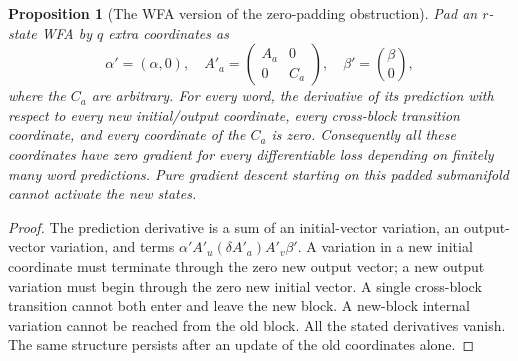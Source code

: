 \documentclass[11pt]{article}
\newtheorem{proposition}[theorem]{Proposition}
\theoremstyle{definition}
\theoremstyle{remark}
\begin{document}
\begin{proposition}[The WFA version of the zero-padding obstruction]
\label{ce:wfa-dead}
Pad an $r$-state WFA by $q$ extra coordinates as
\[
 \alpha'=(\alpha,0),\quad
 A'_a=\begin{pmatrix}A_a&0\\0&C_a\end{pmatrix},\quad
 \beta'=\binom\beta0,
\]
where the $C_a$ are arbitrary. For every word, the derivative of its
prediction with respect to every new initial/output coordinate, every
cross-block transition coordinate, and every coordinate of the $C_a$ is
zero. Consequently all these coordinates have zero gradient for every
differentiable loss depending on finitely many word predictions. Pure
gradient descent starting on this padded submanifold cannot activate the
new states.
\end{proposition}
\begin{proof}
The prediction derivative is a sum of an initial-vector variation, an
output-vector variation, and terms
$\alpha'A'_u(\delta A'_a)A'_v\beta'$.
A variation in a new initial coordinate must terminate through the zero new
output vector; a new output variation must begin through the zero new
initial vector. A single cross-block transition cannot both enter and leave
the new block. A new-block internal variation cannot be reached from the
old block. All the stated derivatives vanish. The same structure persists
after an update of the old coordinates alone.
\end{proof}
\end{document}
